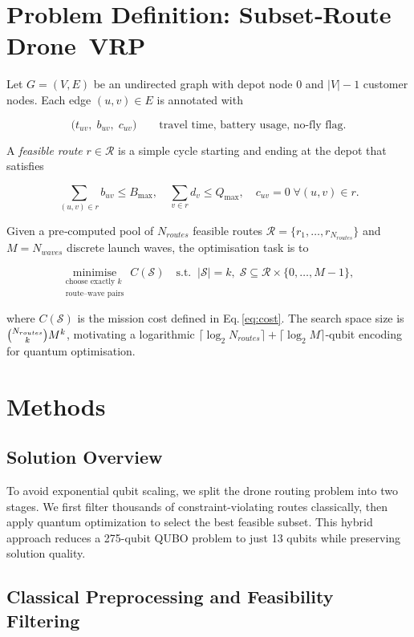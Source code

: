 \section{Problem Definition: Subset‑Route Drone VRP}
\label{sec:problem}

Let $G=(V,E)$ be an undirected graph with depot node $0$ and
$|V|-1$ customer nodes.  Each edge $(u,v)\in E$ is annotated with

\[
\bigl(t_{uv}, \; b_{uv}, \; c_{uv}\bigr)
\qquad
\text{travel time, battery usage, no‑fly flag.}
\]

A \emph{feasible route} $r\in\mathcal{R}$ is a simple cycle starting and
ending at the depot that satisfies

\[
\textstyle
\sum_{(u,v)\in r} b_{uv} \le B_{\max},
\quad
\sum_{v\in r} d_v \le Q_{\max},
\quad
c_{uv}=0 \;\forall(u,v)\in r.
\]

Given a pre‑computed pool of $N_{routes}$ feasible routes
$\mathcal{R}=\{r_1,\dots,r_{N_{routes}}\}$ and $M=N_{waves}$ discrete launch
waves, the optimisation task is to

\[
\underset{
    \substack{\text{choose exactly }k\\ \text{route–wave pairs}}}
    {\text{minimise}}
\; C(\mathcal{S})
\quad
\text{s.t.}
\;\;
|\mathcal{S}|=k,\;
\mathcal{S}\subseteq\mathcal{R}\times\{0,\dots,M-1\},
\]

where $C(\mathcal{S})$ is the mission cost defined in
Eq.\,\eqref{eq:cost}.  The search space size is
${\small\binom{N_{routes}}{k} M^{k}}$, motivating a logarithmic
$\lceil\log_2 N_{routes}\rceil+\lceil\log_2 M\rceil$‑qubit encoding for
quantum optimisation.

\section{Methods}
\subsection{Solution Overview}

To avoid exponential qubit scaling, we split the drone routing problem into two stages. We first filter thousands of constraint-violating routes classically, then apply quantum optimization to select the best feasible subset. This hybrid approach reduces a 275-qubit QUBO problem to just 13 qubits while preserving solution quality.

\subsection{Classical Preprocessing and Feasibility Filtering}


